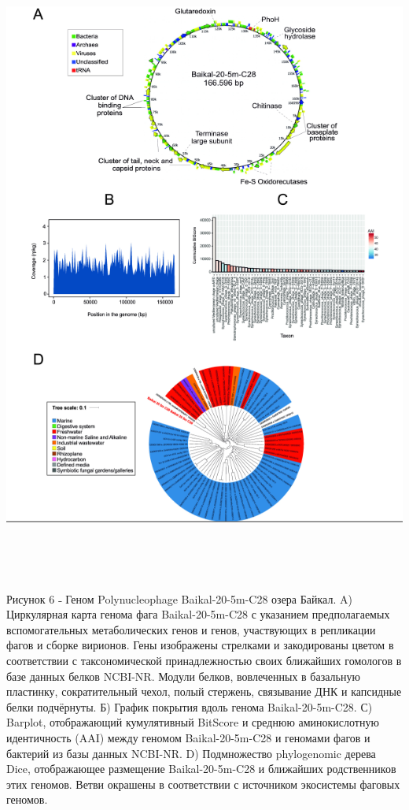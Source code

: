 \documentclass[a4paper,12pt,openany,final]{extreport}
\begin{document}
\includegraphics[width=6.36736in,height=8.26042in]{media/image11.png}

Рисунок 6 ˗ Геном Polynucleophage Baikal-20-5m-C28 озера Байкал. A)
Циркулярная карта генома фага Baikal-20-5m-C28 с указанием
предполагаемых вспомогательных метаболических генов и генов, участвующих
в репликации фагов и сборке вирионов. Гены изображены стрелками и
закодированы цветом в соответствии с таксономической принадлежностью
своих ближайших гомологов в базе данных белков NCBI-NR. Модули белков,
вовлеченных в базальную пластинку, сократительный чехол, полый стержень,
связывание ДНК и капсидные белки подчёрнуты. Б) График покрытия вдоль
генома Baikal-20-5m-C28. С) Barplot, отображающий кумулятивный BitScore
и среднюю аминокислотную идентичность (AAI) между геномом
Baikal-20-5m-C28 и геномами фагов и бактерий из базы данных NCBI-NR. D)
Подмножество phylogenomic дерева Dice, отображающее размещение
Baikal-20-5m-C28 и ближайших родственников этих геномов. Ветви окрашены
в соответствии с источником экосистемы фаговых геномов.
\end{document}
